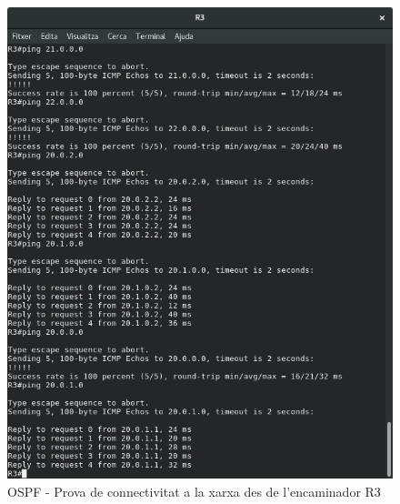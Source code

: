 \documentclass[10pt]{article}
\begin{document}
\begin{figure}[H]
\begin{center}
\includegraphics[scale=0.4]{Images/ospf-R3-conectivity.png}
\caption{OSPF - Prova de connectivitat a la xarxa des de l'encaminador R3}
\end{center}
\end{figure}
\end{document}
